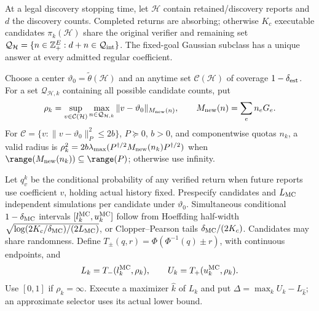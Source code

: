At a legal discovery stopping time, let $\mathcal H$ contain retained/discovery reports and $d$ the discovery counts. Completed returns are absorbing; otherwise $K_c$ executable candidates $\pi_k(\mathcal H)$ share the original verifier and remaining set $\mathcal Q_{\mathcal H}=\{n\in\mathbb Z_+^E:d+n\in\mathcal Q_{\rm int}\}$. The fixed-goal Gaussian subclass has a unique answer at every admitted regular coefficient.

Choose a center $\vartheta_0=\widetilde\theta(\mathcal H)$ and an anytime set $\mathcal C(\mathcal H)$ of coverage $1-\delta_{\rm est}$. For a set $\mathcal Q_{\mathcal H,k}$ containing all possible candidate counts, put
$$\rho_k=\sup_{v\in\mathcal C(\mathcal H)}
\max_{n\in\mathcal Q_{\mathcal H,k}}
\|v-\vartheta_0\|_{M_{\rm new}(n)},\qquad
M_{\rm new}(n)=\sum_e n_eG_e.$$
For $\mathcal C=\{v:\|v-\vartheta_0\|_P^2\leq2b\}$, $P\succeq0$, $b>0$, and componentwise quotas $n_k$, a valid radius is $\rho_k^2=2b\lambda_{\max}(P^{\dagger/2}M_{\rm new}(n_k)P^{\dagger/2})$ when $\range(M_{\rm new}(n_k))\subseteq\range(P)$; otherwise use infinity.

Let $q_v^k$ be the conditional probability of any verified return when future reports use coefficient $v$, holding actual history fixed. Prespecify candidates and $L_{\rm MC}$ independent simulations per candidate under $\vartheta_0$. Simultaneous conditional $1-\delta_{\rm MC}$ intervals $[l_k^{\rm MC},u_k^{\rm MC}]$ follow from Hoeffding half-width $\sqrt{\log(2K_c/\delta_{\rm MC})/(2L_{\rm MC})}$, or Clopper--Pearson tails $\delta_{\rm MC}/(2K_c)$. Candidates may share randomness. Define $T_\pm(q,r)=\Phi(\Phi^{-1}(q)\pm r)$, with continuous endpoints, and
\begin{equation}
L_k=T_-(l_k^{\rm MC},\rho_k),\qquad
U_k=T_+(u_k^{\rm MC},\rho_k).
\label{eq:v23transport}
\end{equation}
Use $[0,1]$ if $\rho_k=\infty$. Execute a maximizer $\widehat k$ of $L_k$ and put $\Delta=\max_kU_k-L_{\widehat k}$; an approximate selector uses its actual lower bound.

